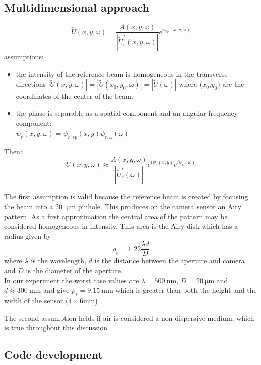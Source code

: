 \documentclass[12pt,a4paper,twoside]{article}
\begin{document}
\subsection{Multidimensional approach}
\begin{equation}
	\tilde{U}(x,y,\omega) = \frac{A(x,y,\omega)}{|\tilde{U}_r^*(x,y,\omega)|}e^{i\psi_r(x,y,\omega)}
\end{equation}
assumptions:
\begin{itemize}
\item the intensity of the reference beam is homogeneous in the transverse directions $|\tilde{U}(x,y,\omega)|=|\tilde{U}(x_0,y_0,\omega)|=|\tilde{U}(\omega)|$ where ($x_0$,$y_0$) are the coordinates of the center of the beam.
\item the phase is separable as a spatial component and an angular frequency component:\\ $\psi_r(x,y,\omega) = \psi_{r,sp}(x,y)\psi_{r,\omega}(\omega)$
\end{itemize}
Then:
\begin{equation}
	\tilde{U}(x,y,\omega) \approx \frac{A(x,y,\omega)}{|\tilde{U}_r^*(\omega)|}e^{i\psi_r(x,y)}e^{i\psi_r(\omega)}
\end{equation}

The first assumption is valid because the reference beam is created by focusing the beam into a \SI{20}{\um} pinhole.
This produces on the camera sensor an Airy pattern.
As a first approximation the central area of the pattern may be considered homogeneous in intensity.
This area is the Airy disk which has a radius given by
$$\rho_s = 1.22 \frac{\lambda d}{D}$$
where $\lambda$ is the wavelength, $d$ is the distance between the aperture and camera and $D$ is the diameter of the aperture.\\
In our experiment the worst case values are $\lambda = \SI{500}{\nm}$, $D = \SI{20}{\um}$ and $d \approx \SI{300}{\mm}$ and give $\rho_s = \SI{9.15}{\mm}$ which is greater than both the height and the width of the sensor ($4 \times 6 \si{\mm}$)

The second assumption helds if air is considered a non dispersive medium, which is true throughout this discussion

\subsection{Code development}
\end{document}
